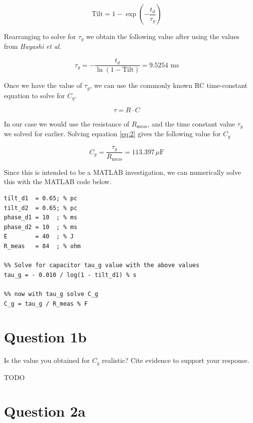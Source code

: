 \documentclass[]{report}
\begin{document}
\begin{equation}
\label{eq:1}
	\text{Tilt} = 1 - \exp{\left( - \frac{t_d}{\tau_g} \right)}
\end{equation}

Rearranging to solve for $\tau_g$ we obtain  the following value after using the values from \textit{Hayashi et al.}

\[
	\tau_g = - \frac{t_d}{\ln{\left( 1 - \text{Tilt} \right)}} = 9.5254 \text{ ms}	
\]

Once we have the value of $\tau_g$, we can use the commonly known RC time-constant equation to solve for $C_g$.

\begin{equation}
\label{eq:2}
	\tau = R \cdot C
\end{equation}

In our case we would use the resistance of $R_\text{meas}$, and the time constant value $\tau_g$ we solved for earlier. Solving equation \ref{eq:2} gives the following value for $C_g$

\[
	C_g = \frac{\tau_g}{R_\text{meas}} = 113.397 \,\mu\text{F}
\]

Since this is intended to be a MATLAB investigation, we can numerically solve this with the MATLAB code below.

\begin{lstlisting}[style=Matlab-editor, backgroundcolor=\color{smoky}]
%% use params from fixed tilt waveform (defib unsuccessful)
tilt_d1  = 0.65; % pc
tilt_d2  = 0.65; % pc
phase_d1 = 10  ; % ms
phase_d2 = 10  ; % ms
E        = 40  ; % J
R_meas   = 84  ; % ohm

%% Solve for capacitor tau_g value with the above values
tau_g = - 0.010 / log(1 - tilt_d1) % s

%% now with tau_g solve C_g
C_g = tau_g / R_meas % F
\end{lstlisting}

\section*{Question 1b}

Is the value you obtained for $C_g$ realistic? Cite evidence to support your response. 

TODO

\section*{Question 2a}
\end{document}
